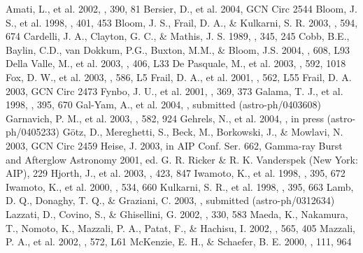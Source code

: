 \documentclass{emulateapj}
\begin{document}
\begin{thebibliography}{}
 Amati, L., et al. 2002, \aap, 390, 81
 Bersier, D., et al. 2004, GCN Circ
  2544
 Bloom, J. S., et al. 1998, \nat, 401,
  453
 Bloom, J. S., Frail,
  D. A., \& Kulkarni, S. R. 2003, \apj, 594, 674
 Cardelli, J. A.,
  Clayton, G. C., \& Mathis, J. S. 1989, \apj, 345, 245
 Cobb, B.E., Baylin, C.D., van Dokkum,
  P.G., Buxton, M.M., \& Bloom, J.S. 2004, \apj, 608, L93
 Della Valle, M., et al. 2003,
  \aap, 406, L33
 De Pasquale, M., et al. 2003,
  \apj, 592, 1018
 Fox, D. W., et al. 2003, \apj, 586, L5
 Frail, D. A., et al. 2001, \apj, 562,
  L55
 Frail, D. A. 2003, GCN Circ 2473
 Fynbo, J. U., et al. 2001, \aap, 369,
  373
 Galama, T. J., et al. 1998, \nat,
  395, 670
 Gal-Yam, A., et al. 2004, \apjl,
  submitted (astro-ph/0403608)
 Garnavich, P. M., et al. 2003,
  \apj, 582, 924
 Gehrels, N., et al. 2004, \apj,
  in press (astro-ph/0405233)
 G\"otz, D., Mereghetti, S., Beck,
  M., Borkowski, J., \& Mowlavi, N. 2003, GCN Circ 2459
 Heise, J. 2003, in AIP
  Conf. Ser. 662, Gamma-ray Burst and Afterglow Astronomy 2001,
  ed. G. R. Ricker \& R. K. Vanderspek (New York: AIP), 229
 Hjorth, J., et al. 2003, \nat, 423,
  847
 Iwamoto, K., et al. 1998, \nat,
  395, 672
 Iwamoto, K., et al. 2000, \apj,
  534, 660
 Kulkarni, S. R., et al. 1998,
  \nat, 395, 663
 Lamb, D. Q., Donaghy, T. Q., \&
  Graziani, C. 2003, \apj, submitted (astro-ph/0312634)
 Lazzati, D., Covino, S., \&
  Ghisellini, G. 2002, \mnras, 330, 583
 Maeda, K., Nakamura, T., Nomoto, K.,
  Mazzali, P. A., Patat, F., \& Hachisu, I. 2002, \apj, 565, 405
 Mazzali, P. A., et al. 2002, \apj,
  572, L61
 McKenzie, E. H., \& Schaefer,
  B. E. 2000, \pasp, 111, 964

\end{thebibliography}
\end{document}
